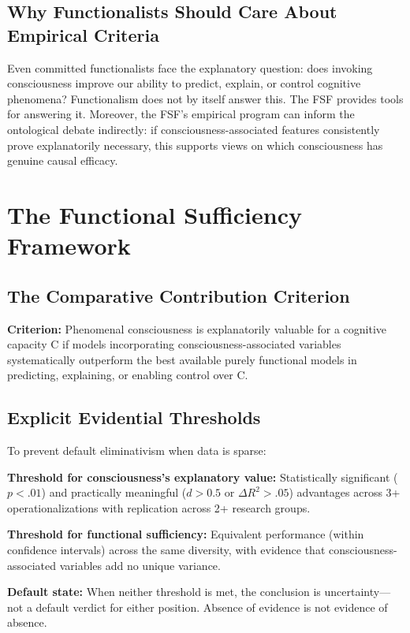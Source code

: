 \documentclass[12pt,a4paper]{article}
\begin{document}
\subsection{Why Functionalists Should Care About Empirical Criteria}

Even committed functionalists face the explanatory question: does invoking consciousness improve our ability to predict, explain, or control cognitive phenomena? Functionalism does not by itself answer this. The FSF provides tools for answering it. Moreover, the FSF's empirical program can inform the ontological debate indirectly: if consciousness-associated features consistently prove explanatorily necessary, this supports views on which consciousness has genuine causal efficacy.

\section{The Functional Sufficiency Framework}

\subsection{The Comparative Contribution Criterion}

\textbf{Criterion:} Phenomenal consciousness is explanatorily valuable for a cognitive capacity C if models incorporating consciousness-associated variables systematically outperform the best available purely functional models in predicting, explaining, or enabling control over C.

\subsection{Explicit Evidential Thresholds}

To prevent default eliminativism when data is sparse:

\textbf{Threshold for consciousness's explanatory value:} Statistically significant ($p < .01$) and practically meaningful ($d > 0.5$ or $\Delta R^2 > .05$) advantages across 3+ operationalizations with replication across 2+ research groups.

\textbf{Threshold for functional sufficiency:} Equivalent performance (within confidence intervals) across the same diversity, with evidence that consciousness-associated variables add no unique variance.

\textbf{Default state:} When neither threshold is met, the conclusion is uncertainty---not a default verdict for either position. Absence of evidence is not evidence of absence.
\end{document}
